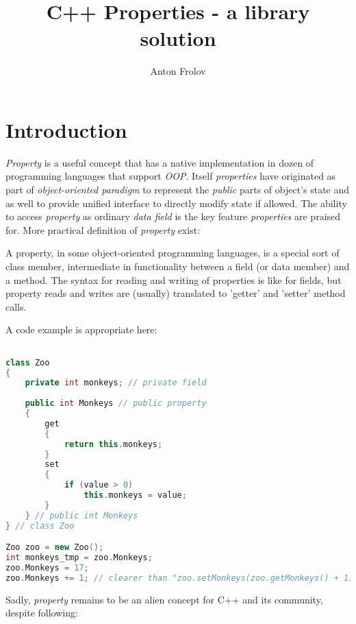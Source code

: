 \documentclass[12pt]{amsart}
\title{C++ Properties - a library solution}
\author{Anton Frolov}
\begin{document}
\maketitle

\clearpage\tableofcontents

\clearpage\section{Introduction}
	\textit{Property} is a useful concept that has a native implementation in dozen of programming languages that support \textit{OOP}. Itself \textit{properties} have originated as part of \textit{object-oriented paradigm} to represent the \textit{public} parts of object's state and as well to provide unified interface to directly modify state if allowed. The ability to access \textit{property} as ordinary \textit{data field} is the key feature \textit{properties} are praised for. More practical definition of \textit{property} exist:
\begin{displayquote}	
	A property, in some object-oriented programming languages, is a special sort of class member, intermediate in functionality between a field (or data member) and a method. The syntax for reading and writing of properties is like for fields, but property reads and writes are (usually) translated to 'getter' and 'setter' method calls. \cite{wiki_properties}
\end{displayquote}
	A code example is appropriate here:
\begin{lstlisting}[language=C++] % use C++ highlighting for C# 

class Zoo 
{
    private int monkeys; // private field
    
    public int Monkeys // public property 
    {  
        get
        {
            return this.monkeys;
        }
        set 
        {
            if (value > 0) 
                this.monkeys = value;
        }
    } // public int Monkeys
} // class Zoo 

Zoo zoo = new Zoo();
int monkeys_tmp = zoo.Monkeys;
zoo.Monkeys = 17;
zoo.Monkeys += 1; // clearer than "zoo.setMonkeys(zoo.getMonkeys() + 1)"

\end{lstlisting}
	Sadly, \textit{property} remains to be an alien concept for C++ and its community, despite following:
\end{document}
